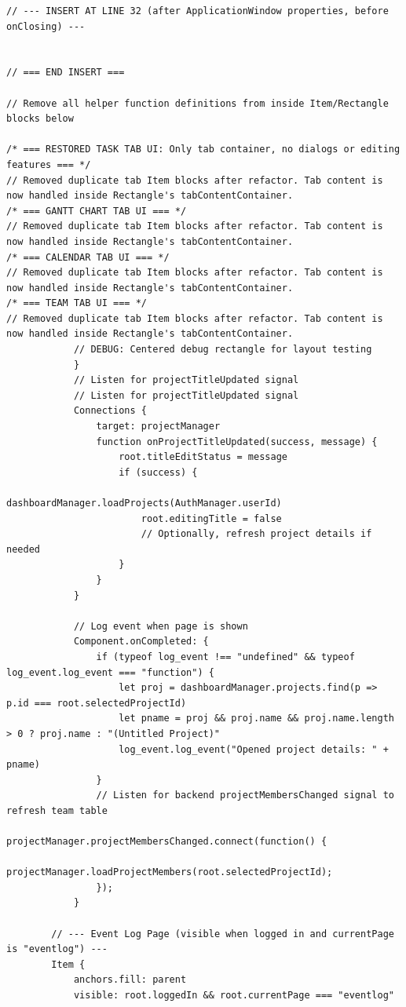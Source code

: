 \documentclass{report}
\begin{document}
\begin{lstlisting}
// --- INSERT AT LINE 32 (after ApplicationWindow properties, before onClosing) ---


// === END INSERT ===

// Remove all helper function definitions from inside Item/Rectangle blocks below

/* === RESTORED TASK TAB UI: Only tab container, no dialogs or editing features === */
// Removed duplicate tab Item blocks after refactor. Tab content is now handled inside Rectangle's tabContentContainer.
/* === GANTT CHART TAB UI === */
// Removed duplicate tab Item blocks after refactor. Tab content is now handled inside Rectangle's tabContentContainer.
/* === CALENDAR TAB UI === */
// Removed duplicate tab Item blocks after refactor. Tab content is now handled inside Rectangle's tabContentContainer.
/* === TEAM TAB UI === */
// Removed duplicate tab Item blocks after refactor. Tab content is now handled inside Rectangle's tabContentContainer.
            // DEBUG: Centered debug rectangle for layout testing
            }
            // Listen for projectTitleUpdated signal
            // Listen for projectTitleUpdated signal
            Connections {
                target: projectManager
                function onProjectTitleUpdated(success, message) {
                    root.titleEditStatus = message
                    if (success) {
                        dashboardManager.loadProjects(AuthManager.userId)
                        root.editingTitle = false
                        // Optionally, refresh project details if needed
                    }
                }
            }

            // Log event when page is shown
            Component.onCompleted: {
                if (typeof log_event !== "undefined" && typeof log_event.log_event === "function") {
                    let proj = dashboardManager.projects.find(p => p.id === root.selectedProjectId)
                    let pname = proj && proj.name && proj.name.length > 0 ? proj.name : "(Untitled Project)"
                    log_event.log_event("Opened project details: " + pname)
                }
                // Listen for backend projectMembersChanged signal to refresh team table
                projectManager.projectMembersChanged.connect(function() {
                    projectManager.loadProjectMembers(root.selectedProjectId);
                });
            }

        // --- Event Log Page (visible when logged in and currentPage is "eventlog") ---
        Item {
            anchors.fill: parent
            visible: root.loggedIn && root.currentPage === "eventlog"


\end{lstlisting}
\end{document}
